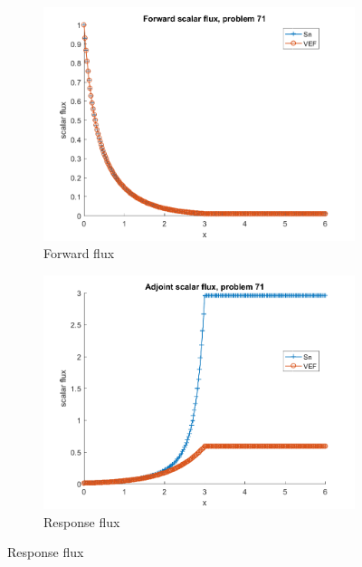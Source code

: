 \documentclass{article}
\begin{document}
\begin{figure}[H]
\label{Case71Flux}
\centering
\begin{subfigure}{.5\textwidth}
  \centering
  \includegraphics[width=.98\linewidth]{IanProposal/figures2/71phi.png}
  \caption{Forward flux}
  \label{fig:sfig1}
\end{subfigure}%
\begin{subfigure}{.5\textwidth}
  \centering
  \includegraphics[width=.98\linewidth]{IanProposal/figures2/71phia.png}
  \caption{Response flux}
  \label{fig:sfig4}
\end{subfigure}%
\end{figure}
\end{document}
